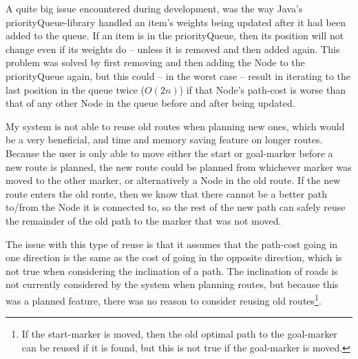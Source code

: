 A quite big issue encountered during development, was the way Java's priorityQueue-library handled an item's weights being updated after it had been added to the queue. If an item is in the priorityQueue, then its position will not change even if its weights do -- unless it is removed and then added again. This problem was solved by first removing and then adding the Node to the priorityQueue again, but this could -- in the worst case -- result in iterating to the last position in the queue twice ($O(2n)$) if that Node's path-cost is worse than that of any other Node in the queue before and after being updated.

My system is not able to reuse old routes when planning new ones, which would be a very beneficial, and time and memory saving feature on longer routes. Because the user is only able to move either the start or goal-marker before a new route is planned, the new route could be planned from whichever marker was moved to the other marker, or alternatively a Node in the old route. If the new route enters the old route, then we know that there cannot be a better path to/from the Node it is connected to, so the rest of the new path can safely reuse the remainder of the old path to the marker that was not moved.

The issue with this type of reuse is that it assumes that the path-cost going in one direction is the same as the cost of going in the opposite direction, which is not true when considering the inclination of a path. The inclination of roads is not currently considered by the system when planning routes, but because this was a planned feature, there was no reason to consider reusing old routes\footnote{If the start-marker is moved, then the old optimal path to the goal-marker can be reused if it is found, but this is not true if the goal-marker is moved.}.

